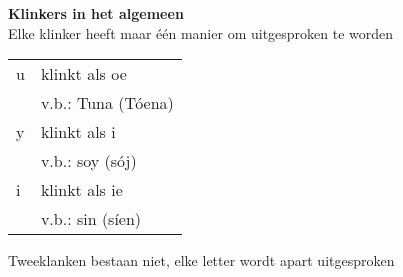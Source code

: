 \textbf{Klinkers in het algemeen}\\
Elke klinker heeft maar \'e\'en manier om uitgesproken te worden\\
\begin{tabular}{l l}
u & klinkt als oe\\
 & v.b.: Tuna (T\'oena)\\
y & klinkt als i\\
 & v.b.: soy (s\'oj)\\
i & klinkt als ie\\
 & v.b.: sin (s\'ien)\\
\end{tabular}

Tweeklanken bestaan niet, elke letter wordt apart uitgesproken
